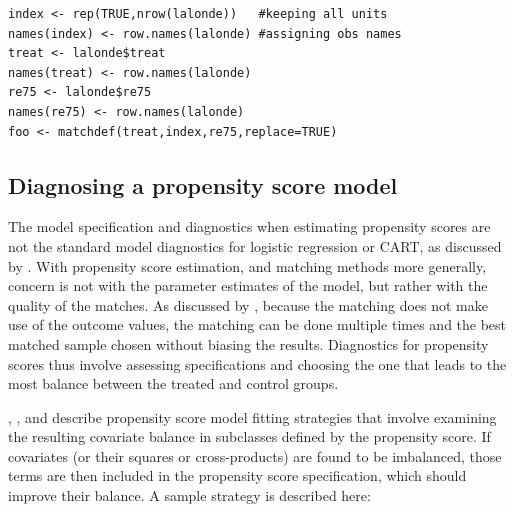 \documentclass[oneside,letterpaper,titlepage]{article}
\begin{document}
\begin{verbatim}
index <- rep(TRUE,nrow(lalonde))   #keeping all units
names(index) <- row.names(lalonde) #assigning obs names
treat <- lalonde$treat
names(treat) <- row.names(lalonde)
re75 <- lalonde$re75
names(re75) <- row.names(lalonde)
foo <- matchdef(treat,index,re75,replace=TRUE)
\end{verbatim}

\subsection{Diagnosing a propensity score model}
The model specification and diagnostics when estimating propensity
scores are not the standard model diagnostics for logistic regression
or CART, as discussed by \cite{Rubin04}.  With propensity score
estimation, and matching methods more generally, concern is not with
the parameter estimates of the model, but rather with the quality of
the matches.  As discussed by \cite{Greevy04}, because the matching
does not make use of the outcome values, the matching can be done
multiple times and the best matched sample chosen without biasing the
results.  Diagnostics for propensity scores thus involve assessing
specifications and choosing the one that leads to the most balance
between the treated and control groups.

\cite{RosRub84a}, \cite{Perkins00}, and \cite{DehWah02} describe
propensity score model fitting strategies that involve examining the
resulting covariate balance in subclasses defined by the propensity
score.  If covariates (or their squares or cross-products) are found
to be imbalanced, those terms are then included in the propensity
score specification, which should improve their balance.  A sample
strategy is described here:
\end{document}
